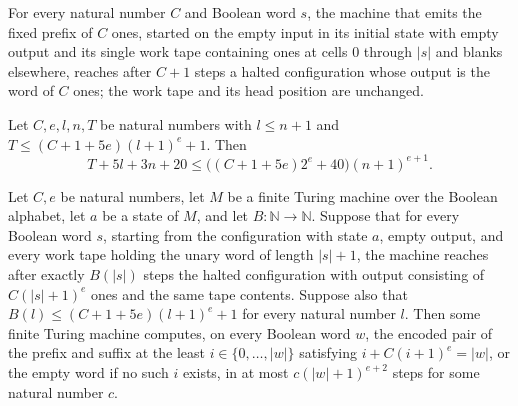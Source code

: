 \begin{lemma}
\label{Turing.FinTM.splitSource_constant}
\leanok
{}
For every natural number $C$ and Boolean word $s$, the machine that emits the fixed
prefix of $C$ ones, started on the empty input in its initial state with empty output
and its single work tape containing ones at cells $0$ through $|s|$ and blanks
elsewhere, reaches after $C+1$ steps a halted configuration whose output is the word of
$C$ ones; the work tape and its head position are unchanged.
\end{lemma}

\begin{lemma}
\label{Turing.FinTM.splitBody_envelope}
\leanok
{}
Let $C,e,l,n,T$ be natural numbers with $l\le n+1$ and $T\le (C+1+5e)(l+1)^e+1$. Then
\[T+5l+3n+20\le \bigl((C+1+5e)2^e+40\bigr)(n+1)^{e+1}.\]
\end{lemma}

\begin{lemma}
\label{Turing.FinTM.splitSolve_source}
\leanok
{}
Let $C,e$ be natural numbers, let $M$ be a finite Turing machine over the Boolean
alphabet, let $a$ be a state of $M$, and let $B:\mathbb{N}\to\mathbb{N}$. Suppose that
for every Boolean word $s$, starting from the configuration with state $a$, empty
output, and every work tape holding the unary word of length $|s|+1$, the machine
reaches after exactly $B(|s|)$ steps the halted configuration with output consisting of
$C(|s|+1)^e$ ones and the same tape contents. Suppose also that $B(l)\le
(C+1+5e)(l+1)^e+1$ for every natural number $l$. Then some finite Turing machine
computes, on every Boolean word $w$, the encoded pair of the prefix and suffix at the
least $i\in\{0,\ldots,|w|\}$ satisfying $i+C(i+1)^e=|w|$, or the empty word if no such
$i$ exists, in at most $c(|w|+1)^{e+2}$ steps for some natural number $c$.
\end{lemma}

